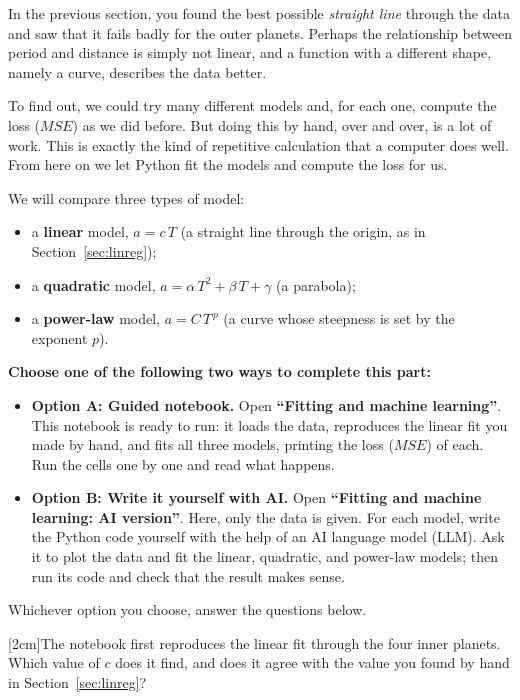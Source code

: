 \documentclass[12pt]{article}
\makeatletter
\newcounter{question}
\newlength\questionheight
\newcommand{\question}{\@ifstar{\question@text}{\question@field}}
\newcommand{\question@heading}[1]{%
  \refstepcounter{question}%
  \vspace{0.3cm}%
  \noindent\textbf{\faEdit\ Question \thequestion: #1}%
}
\newcommand{\question@text}[1]{%
  \question@heading{#1}%
}
\newcommand{\question@field}[2][\questionheight]{%
  \question@heading{#2}%
 \\[0.3em] \begin{Form}
    \TextField[
      name=Q\thequestion,
      multiline=true,
      width=\linewidth,
      height=#1,
      charsize=10pt,
      bordercolor={0 0 0},
      borderwidth=1.8,
      backgroundcolor={1 1 1}
    ]{}
  \end{Form}
  \vspace{0.3cm}%
}
\makeatother
\begin{document}
In the previous section, you found the best possible \emph{straight line} through the data and saw that it fails badly for the outer planets. Perhaps the relationship between period and distance is simply not linear, and a function with a different shape, namely a curve, describes the data better.

To find out, we could try many different models and, for each one, compute the loss ($MSE$) as we did before. But doing this by hand, over and over, is a lot of work. This is exactly the kind of repetitive calculation that a computer does well. From here on we let Python fit the models and compute the loss for us.

We will compare three types of model:
\begin{itemize}
  \item a \textbf{linear} model, \quad $a = c\,T$ \quad (a straight line through the origin, as in Section~\ref{sec:linreg});
  \item a \textbf{quadratic} model, \quad $a = \alpha\,T^2 + \beta\,T + \gamma$ \quad (a parabola);
  \item a \textbf{power-law} model, \quad $a = C\,T^{\,p}$ \quad (a curve whose steepness is set by the exponent $p$).
\end{itemize}

\begin{importantbox}
\textbf{Choose one of the following two ways to complete this part:}
\begin{itemize}
  \item \textbf{Option A: Guided notebook.} Open \textbf{``Fitting and machine learning''}. This notebook is ready to run: it loads the data, reproduces the linear fit you made by hand, and fits all three models, printing the loss ($MSE$) of each. Run the cells one by one and read what happens.
  \item \textbf{Option B: Write it yourself with AI.} Open \textbf{``Fitting and machine learning: AI version''}. Here, only the data is given. For each model, write the Python code yourself with the help of an AI language model (LLM). Ask it to plot the data and fit the linear, quadratic, and power-law models; then run its code and check that the result makes sense.
\end{itemize}
Whichever option you choose, answer the questions below.
\end{importantbox}

\question[2cm]{The notebook first reproduces the linear fit through the four inner planets. Which value of $c$ does it find, and does it agree with the value you found by hand in Section~\ref{sec:linreg}?}
\end{document}
